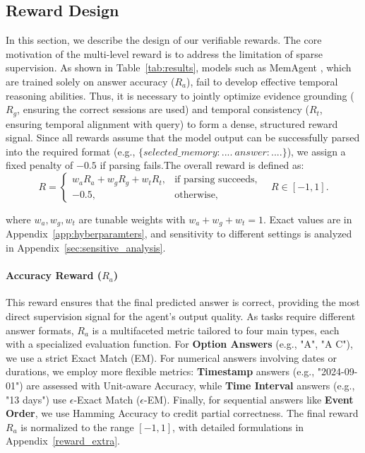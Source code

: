 \documentclass{article} %
\begin{document}
\subsection{Reward Design}
\label{sec:reward}
In this section, we describe the design of our verifiable rewards. The core motivation of the multi-level reward is to address the limitation of sparse supervision. As shown in Table~\ref{tab:results}, models such as MemAgent \citep{yu2025memagent}, which are trained solely on answer accuracy ($R_a$), fail to develop effective temporal reasoning abilities. Thus, it is necessary to jointly optimize evidence grounding ($R_g$, ensuring the correct sessions are used) and temporal consistency ($R_t$, ensuring temporal alignment with query) to form a dense, structured reward signal. Since all rewards assume that the model output can be successfully parsed into the required format (e.g., $\{selected\_memory: ....\ answer:....\}$), we assign a fixed penalty of $-0.5$ if parsing fails.The overall reward is defined as:
\begin{equation}
R =
\begin{cases}
w_a R_a + w_g R_g + w_t R_t, & \text{if parsing succeeds},\\[6pt]
-0.5, & \text{otherwise},
\end{cases}
\quad R \in [-1,1].
\end{equation}

where $w_a, w_g, w_t$ are tunable weights with $w_a + w_g + w_t = 1$. Exact values are in Appendix~\ref{app:hyberparamters}, and sensitivity to different settings is analyzed in Appendix~\ref{sec:sensitive_analysis}.

\paragraph{Accuracy Reward ($R_a$)}
This reward ensures that the final predicted answer is correct, providing the most direct supervision signal for the agent’s output quality. As tasks require different answer formats, $R_a$ is a multifaceted metric tailored to four main types, each with a specialized evaluation function. For \textbf{Option Answers} (e.g., "A", "A C"), we use a strict Exact Match (EM). For numerical answers involving dates or durations, we employ more flexible metrics: \textbf{Timestamp} answers (e.g., "2024-09-01") are assessed with Unit-aware Accuracy, while \textbf{Time Interval} answers (e.g., "13 days") use $\epsilon$-Exact Match ($\epsilon$-EM). Finally, for sequential answers like \textbf{Event Order}, we use Hamming Accuracy to credit partial correctness. The final reward $R_a$ is normalized to the range $[-1, 1]$, with detailed formulations in Appendix~\ref{reward_extra}.
\end{document}
